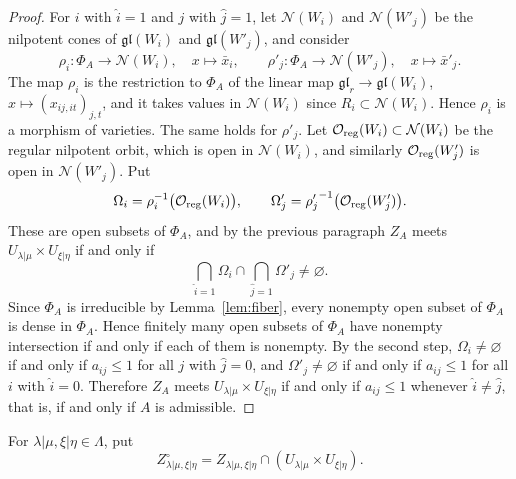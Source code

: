 \documentclass[11pt,a4paper]{amsart}
\theoremstyle{definition}
\theoremstyle{remark}
\newcommand{\N}{\mathcal N}
\newcommand{\lm}{\lambda|\mu}
\newcommand{\xh}{\xi|\eta}
\numberwithin{equation}{section}
\begin{document}
\begin{proof}
For $i$ with
$\widehat i=1$ and $j$ with $\widehat j=1$, let $\N(W_i)$ and
$\N(W'_j)$ be the nilpotent cones of $\mathfrak{gl}(W_i)$ and
$\mathfrak{gl}(W'_j)$, and consider
$$
\rho_i:\Phi_A\longrightarrow\N(W_i),\quad x\longmapsto \bar x_i,\qquad
\rho'_j:\Phi_A\longrightarrow\N(W'_j),\quad x\longmapsto \bar x'_j .
$$
The map $\rho_i$ is the restriction to $\Phi_A$ of the linear map
$\mathfrak{gl}_r\to\mathfrak{gl}(W_i)$, $x\mapsto(x_{ij,it})_{j,t}$, and
it takes values in $\N(W_i)$ since $R_i\subset\N(W_i)$. Hence $\rho_i$ is
a morphism of varieties. The same holds for $\rho'_j$. Let
$\mathcal O_{\rm reg}(W_i)\subset\N(W_i)$ be the regular nilpotent orbit, which is open in
$\N(W_i)$, and similarly $\mathcal O_{\rm reg}(W'_j)$ is open in
$\N(W'_j)$. Put
$$
\Omega_i=\rho_i^{-1}\bigl(\mathcal O_{\rm reg}(W_i)\bigr),\qquad
\Omega'_j={\rho'_j}^{-1}\bigl(\mathcal O_{\rm reg}(W'_j)\bigr).
$$
These are open subsets of $\Phi_A$, and by the previous paragraph $Z_A$
meets $U_{\lm}\times U_{\xh}$ if and only if
$$
\bigcap_{\widehat i=1}\Omega_i\cap\bigcap_{\widehat j=1}\Omega'_j
\ne\varnothing .
$$
Since $\Phi_A$ is irreducible by Lemma~\ref{lem:fiber}, every nonempty
open subset of $\Phi_A$ is dense in $\Phi_A$. Hence finitely many open
subsets of $\Phi_A$ have nonempty intersection if and only if each of
them is nonempty. By the second step, $\Omega_i\ne\varnothing$ if and
only if $a_{ij}\le1$ for all $j$ with $\widehat j=0$, and
$\Omega'_j\ne\varnothing$ if and only if $a_{ij}\le1$ for all $i$ with
$\widehat i=0$. Therefore $Z_A$ meets $U_{\lm}\times U_{\xh}$ if and
only if $a_{ij}\le1$ whenever $\widehat i\ne\widehat j$, that is, if and
only if $A$ is admissible.
\end{proof}

For $\lm,\xh\in\Lambda$, put
$$
Z_{\lm,\xh}^{\circ}=Z_{\lm,\xh}\cap(U_{\lm}\times U_{\xh}).
$$
\end{document}
